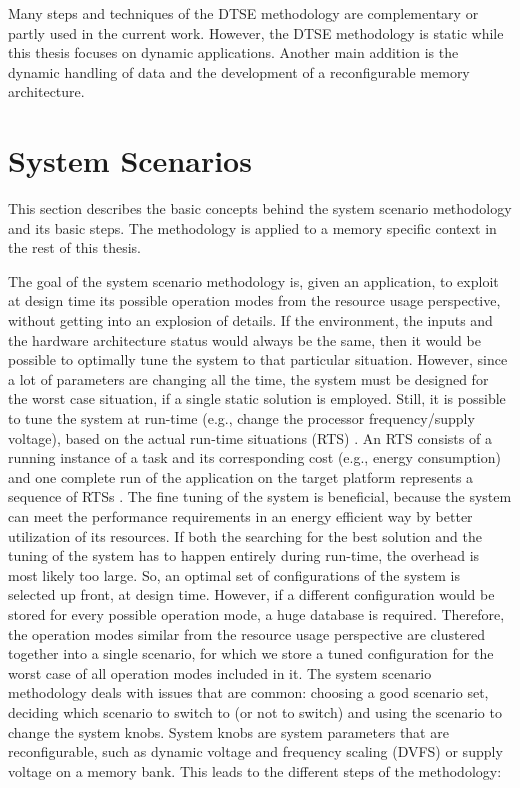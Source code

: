 Many steps and techniques of the DTSE methodology are complementary or partly used in the current work.
However, the DTSE methodology is static while this thesis focuses on dynamic applications.
Another main addition is the dynamic handling of data and the development of a reconfigurable memory architecture.

\section{System Scenarios}

This section describes the basic concepts behind the system scenario methodology and its basic steps.
The methodology is applied to a memory specific context in the rest of this thesis. 

The goal of the system scenario methodology is, given an application, to exploit at design time its possible operation modes from the resource usage perspective, without getting into an explosion of details. 
If the environment, the inputs and the hardware architecture status would always be the same, then it would be possible to optimally tune the system to that particular situation. 
However, since a lot of parameters are changing all the time, the system must be designed for the worst case situation, if a single static solution is employed. 
Still, it is possible to tune the system at run-time (e.g., change the processor frequency/supply voltage), based on the actual run-time situations (RTS) . 
An RTS consists of a running instance of a task and its corresponding cost (e.g., energy consumption) and one complete run of the application on the target platform represents a sequence of RTSs \cite{Elena2010}. 
The fine tuning of the system is beneficial, because the system can meet the performance requirements in an energy efficient way by better utilization of its resources. 
If both the searching for the best solution and the tuning of the system has to happen entirely during run-time, the overhead is most likely too large.
So, an optimal set of configurations of the system is selected up front, at design time. 
However, if a different configuration would be stored for every possible operation mode, a huge database is required. 
Therefore, the operation modes similar from the resource usage perspective are clustered together into a single scenario, for which we store a tuned configuration for the worst case of all operation modes included in it.
The system scenario methodology deals with issues that are common: choosing a good scenario set, deciding which scenario to switch to (or not to switch) and using the scenario to change the system knobs.
System knobs are system parameters that are reconfigurable, such as dynamic voltage and frequency scaling (DVFS)  or supply voltage on a memory bank. 
This leads to the different steps of the methodology:

